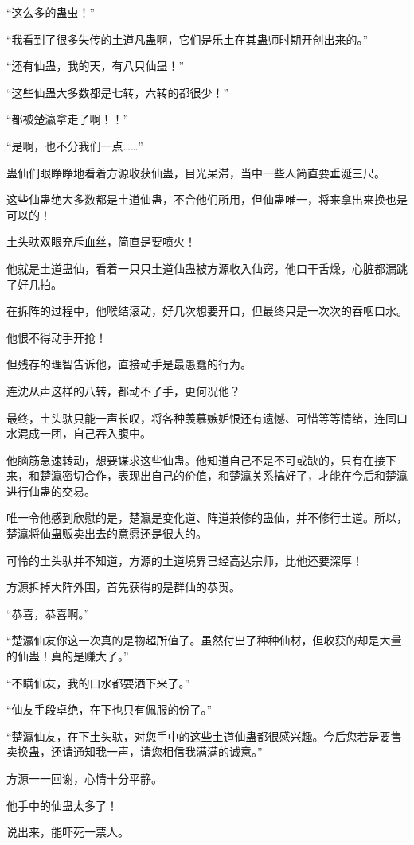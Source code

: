 \begin{this_body}
“这么多的蛊虫！”

“我看到了很多失传的土道凡蛊啊，它们是乐土在其蛊师时期开创出来的。”

“还有仙蛊，我的天，有八只仙蛊！”

“这些仙蛊大多数都是七转，六转的都很少！”

“都被楚瀛拿走了啊！！”

“是啊，也不分我们一点……”

蛊仙们眼睁睁地看着方源收获仙蛊，目光呆滞，当中一些人简直要垂涎三尺。

这些仙蛊绝大多数都是土道仙蛊，不合他们所用，但仙蛊唯一，将来拿出来换也是可以的！

土头驮双眼充斥血丝，简直是要喷火！

他就是土道蛊仙，看着一只只土道仙蛊被方源收入仙窍，他口干舌燥，心脏都漏跳了好几拍。

在拆阵的过程中，他喉结滚动，好几次想要开口，但最终只是一次次的吞咽口水。

他恨不得动手开抢！

但残存的理智告诉他，直接动手是最愚蠢的行为。

连沈从声这样的八转，都动不了手，更何况他？

最终，土头驮只能一声长叹，将各种羡慕嫉妒恨还有遗憾、可惜等等情绪，连同口水混成一团，自己吞入腹中。

他脑筋急速转动，想要谋求这些仙蛊。他知道自己不是不可或缺的，只有在接下来，和楚瀛密切合作，表现出自己的价值，和楚瀛关系搞好了，才能在今后和楚瀛进行仙蛊的交易。

唯一令他感到欣慰的是，楚瀛是变化道、阵道兼修的蛊仙，并不修行土道。所以，楚瀛将仙蛊贩卖出去的意愿还是很大的。

可怜的土头驮并不知道，方源的土道境界已经高达宗师，比他还要深厚！

方源拆掉大阵外围，首先获得的是群仙的恭贺。

“恭喜，恭喜啊。”

“楚瀛仙友你这一次真的是物超所值了。虽然付出了种种仙材，但收获的却是大量的仙蛊！真的是赚大了。”

“不瞒仙友，我的口水都要洒下来了。”

“仙友手段卓绝，在下也只有佩服的份了。”

“楚瀛仙友，在下土头驮，对您手中的这些土道仙蛊都很感兴趣。今后您若是要售卖换蛊，还请通知我一声，请您相信我满满的诚意。”

方源一一回谢，心情十分平静。

他手中的仙蛊太多了！

说出来，能吓死一票人。


\end{this_body}
